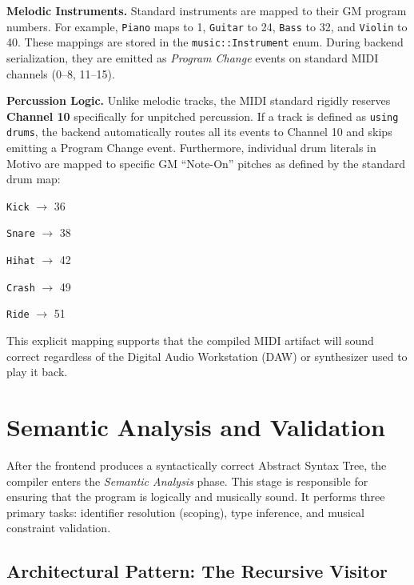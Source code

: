 \noindent \textbf{Melodic Instruments.} Standard instruments are mapped to their GM program numbers.
For example, \texttt{Piano} maps to 1, \texttt{Guitar} to 24, \texttt{Bass} to 32, and \texttt{Violin} to 40.
These mappings are stored in the \texttt{music::Instrument} enum.
During backend serialization, they are emitted as \textit{Program Change} events on standard MIDI channels (0--8,
11--15).

\noindent \textbf{Percussion Logic.} Unlike melodic tracks, the MIDI standard rigidly reserves \textbf{Channel 10}
specifically for unpitched percussion.
If a track is defined as \texttt{using drums}, the backend automatically routes all its events to Channel 10 and
skips emitting a Program Change event.
Furthermore, individual drum literals in Motivo are mapped to specific GM ``Note-On'' pitches as defined by the
standard drum map:

\noindent \texttt{Kick} $\rightarrow$ 36

\noindent \texttt{Snare} $\rightarrow$ 38

\noindent \texttt{Hihat} $\rightarrow$ 42

\noindent \texttt{Crash} $\rightarrow$ 49

\noindent \texttt{Ride} $\rightarrow$ 51

This explicit mapping supports that the compiled MIDI artifact will sound correct regardless of the Digital Audio
Workstation (DAW) or synthesizer used to play it back.


\section{Semantic Analysis and Validation}\label{detail-sec:implementation-semantic}

After the frontend produces a syntactically correct Abstract Syntax Tree, the compiler enters the \textit{Semantic
Analysis} phase.
This stage is responsible for ensuring that the program is logically and musically sound.
It performs three primary tasks: identifier resolution (scoping), type inference, and musical constraint validation.

\subsection{Architectural Pattern: The Recursive
Visitor}\label{detail-subsec:architectural-pattern:-the-recursive-visitor}

